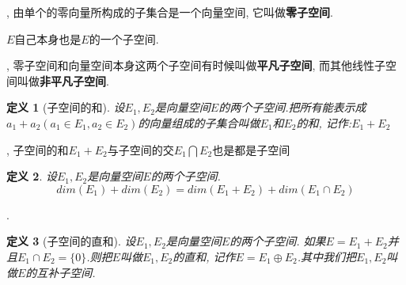 \documentclass[a4paper,11pt]{article}
\newtheorem{definition}{\hspace{2em}定义}[section]
\begin{document}
, 由单个的零向量所构成的子集合是一个向量空间, 它叫做\textbf{零子空间}.

$E$自己本身也是$E$的一个子空间.

, 零子空间和向量空间本身这两个子空间有时候叫做\textbf{平凡子空间}, 而其他线性子空间叫做\textbf{非平凡子空间}.
\begin{definition}[子空间的和]
  设$E_1,E_2$是向量空间$E$的两个子空间.把所有能表示成$a_1+a_2(a_1\in E_1,a_2\in E_2)$的向量组成的子集合叫做$E_1$和$E_2$的和, 记作:$E_1+E_2$
\end{definition}
, 子空间的和$E_1+E_2$与子空间的交$E_1\bigcap E_2$也是都是子空间
\begin{definition}
  设$E_1,E_2$是向量空间$E$的两个子空间.
  \begin{equation*}
    dim(E_1)+dim(E_2)=dim(E_1+E_2)+dim(E_1\cap E_2)
  \end{equation*}
\end{definition}
.
\begin{definition}[子空间的直和]
  设$E_1,E_2$是向量空间$E$的两个子空间. 如果$E=E_1+E_2$并且$E_1\cap E_2=\{0\}$.则把$E$叫做$E_1,E_2$的直和, 记作$E=E_1\oplus E_2$.其中我们把$E_1,E_2$叫做$E$的互补子空间.
\end{definition}
\end{document}

